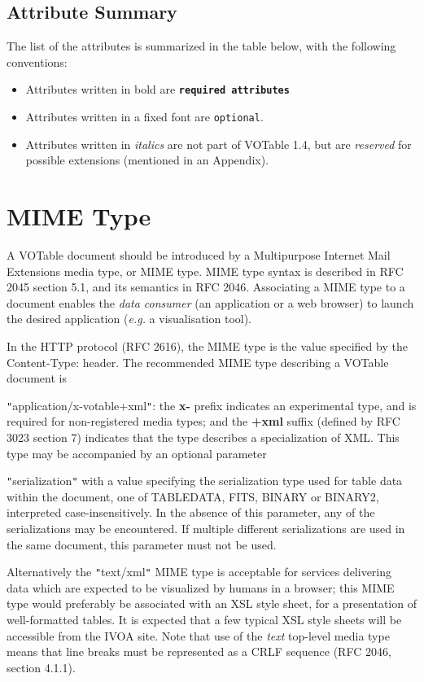 \documentclass[11pt,a4paper]{ivoa}
\let\fg=\color
\def\attr#1{{\tt{\fg{DarkRed}#1}}}
\def\requiredattr#1{{\tt\bf{\fg{DarkBlue}#1}}}
\def\literalvalue#1{{\tt"}{{\fg{DarkPurple}#1}}{\tt"}}
\begin{document}
{\clearpage
\subsection{Attribute Summary}
The list of the attributes is summarized in the table below,
with the following conventions:
\begin{itemize}
\item   Attributes written in bold are \requiredattr{required attributes}
\item   Attributes written in a {fixed font} are \attr{optional}.
\item   Attributes written in {\it italics}
        are not part of VOTable 1.4, but are {\it reserved}
        for possible extensions (mentioned in an Appendix).
\end{itemize}

\bigskip
\begin{quote}\small

\end{quote}

\clearpage
\section{MIME Type}
\label{sec:mime}
A VOTable document should be introduced by a
Multipurpose Internet Mail Extensions media type, or MIME type.
MIME type syntax is described in RFC 2045 section 5.1, and
its semantics in RFC 2046.
Associating a MIME type to a document enables the {\em data consumer}
(an application or a web browser) to launch the desired application
({\em e.g.} a visualisation tool).

In the HTTP protocol (RFC 2616), the MIME type is the value specified by the
{\textsf{Content-Type:}} header. The recommended MIME type describing
a VOTable document is {\literalvalue{\textsf{application/x-votable+xml}}:
the {\bf x-} prefix indicates an experimental type, and
is required for non-registered media types; and the
{\bf+xml} suffix (defined by RFC 3023 section 7)
indicates that the type describes a specialization of XML.
This type may be accompanied by an optional parameter
{\literalvalue{\textsf{serialization}}
with a value specifying the serialization type used for table data within the
document, one of TABLEDATA, FITS, BINARY or BINARY2,
interpreted case-insensitively.
In the absence of this parameter, any of the serializations may be
encountered.  If multiple different serializations are used in the same
document, this parameter must not be used.

Alternatively the {\literalvalue{\textsf{text/xml}}} MIME type is acceptable
for services delivering data which are expected to be
visualized by humans in a browser; this MIME type
would preferably be associated with an XSL style sheet,
for a presentation of well-formatted tables. It is expected
that a few typical XSL style sheets will be accessible from
the IVOA site.
Note that use of the {\em text} top-level media type means that
line breaks must be represented as a CRLF sequence
(RFC 2046, section 4.1.1).

}}}
\end{document}
